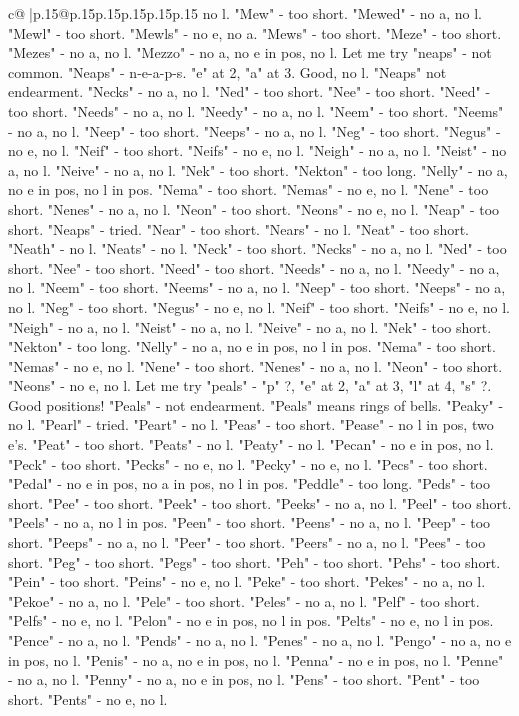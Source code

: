 \documentclass{article}
\begin{document}
{\begin{supertabular}{c@{$\;$}|p{.15\linewidth}@{}p{.15\linewidth}p{.15\linewidth}p{.15\linewidth}p{.15\linewidth}p{.15\linewidth}}
{{{no l. "Mew" {-} too short. "Mewed" {-} no a, no l. "Mewl" {-} too short. "Mewls" {-} no e, no a. "Mews" {-} too short. "Meze" {-} too short. "Mezes" {-} no a, no l. "Mezzo" {-} no a, no e in pos, no l. Let me try "neaps" {-} not common. "Neaps" {-} n{-}e{-}a{-}p{-}s. "e" at 2, "a" at 3. Good, no l. "Neaps" not endearment. "Necks" {-} no a, no l. "Ned" {-} too short. "Nee" {-} too short. "Need" {-} too short. "Needs" {-} no a, no l. "Needy" {-} no a, no l. "Neem" {-} too short. "Neems" {-} no a, no l. "Neep" {-} too short. "Neeps" {-} no a, no l. "Neg" {-} too short. "Negus" {-} no e, no l. "Neif" {-} too short. "Neifs" {-} no e, no l. "Neigh" {-} no a, no l. "Neist" {-} no a, no l. "Neive" {-} no a, no l. "Nek" {-} too short. "Nekton" {-} too long. "Nelly" {-} no a, no e in pos, no l in pos. "Nema" {-} too short. "Nemas" {-} no e, no l. "Nene" {-} too short. "Nenes" {-} no a, no l. "Neon" {-} too short. "Neons" {-} no e, no l. "Neap" {-} too short. "Neaps" {-} tried. "Near" {-} too short. "Nears" {-} no l. "Neat" {-} too short. "Neath" {-} no l. "Neats" {-} no l. "Neck" {-} too short. "Necks" {-} no a, no l. "Ned" {-} too short. "Nee" {-} too short. "Need" {-} too short. "Needs" {-} no a, no l. "Needy" {-} no a, no l. "Neem" {-} too short. "Neems" {-} no a, no l. "Neep" {-} too short. "Neeps" {-} no a, no l. "Neg" {-} too short. "Negus" {-} no e, no l. "Neif" {-} too short. "Neifs" {-} no e, no l. "Neigh" {-} no a, no l. "Neist" {-} no a, no l. "Neive" {-} no a, no l. "Nek" {-} too short. "Nekton" {-} too long. "Nelly" {-} no a, no e in pos, no l in pos. "Nema" {-} too short. "Nemas" {-} no e, no l. "Nene" {-} too short. "Nenes" {-} no a, no l. "Neon" {-} too short. "Neons" {-} no e, no l. Let me try "peals" {-} "p" ?, "e" at 2, "a" at 3, "l" at 4, "s" ?. Good positions! "Peals" {-} not endearment. "Peals" means rings of bells. "Peaky" {-} no l. "Pearl" {-} tried. "Peart" {-} no l. "Peas" {-} too short. "Pease" {-} no l in pos, two e's. "Peat" {-} too short. "Peats" {-} no l. "Peaty" {-} no l. "Pecan" {-} no e in pos, no l. "Peck" {-} too short. "Pecks" {-} no e, no l. "Pecky" {-} no e, no l. "Pecs" {-} too short. "Pedal" {-} no e in pos, no a in pos, no l in pos. "Peddle" {-} too long. "Peds" {-} too short. "Pee" {-} too short. "Peek" {-} too short. "Peeks" {-} no a, no l. "Peel" {-} too short. "Peels" {-} no a, no l in pos. "Peen" {-} too short. "Peens" {-} no a, no l. "Peep" {-} too short. "Peeps" {-} no a, no l. "Peer" {-} too short. "Peers" {-} no a, no l. "Pees" {-} too short. "Peg" {-} too short. "Pegs" {-} too short. "Peh" {-} too short. "Pehs" {-} too short. "Pein" {-} too short. "Peins" {-} no e, no l. "Peke" {-} too short. "Pekes" {-} no a, no l. "Pekoe" {-} no a, no l. "Pele" {-} too short. "Peles" {-} no a, no l. "Pelf" {-} too short. "Pelfs" {-} no e, no l. "Pelon" {-} no e in pos, no l in pos. "Pelts" {-} no e, no l in pos. "Pence" {-} no a, no l. "Pends" {-} no a, no l. "Penes" {-} no a, no l. "Pengo" {-} no a, no e in pos, no l. "Penis" {-} no a, no e in pos, no l. "Penna" {-} no e in pos, no l. "Penne" {-} no a, no l. "Penny" {-} no a, no e in pos, no l. "Pens" {-} too short. "Pent" {-} too short. "Pents" {-} no e, no l. }}}
\end{supertabular}}
\end{document}
